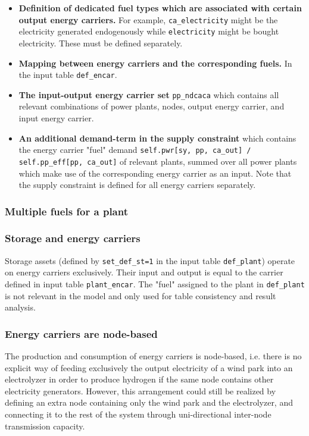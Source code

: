 \documentclass[]{article}
\begin{document}
\begin{itemize}
	\item \textbf{Definition of dedicated fuel types which are associated with certain output energy carriers.} For example, \verb|ca_electricity| might be the electricity generated endogenously while \verb|electricity| might be bought electricity. These must be defined separately.
	\item \textbf{Mapping between energy carriers and the corresponding fuels.} In the input table \verb|def_encar|.
	\item \textbf{The input-output energy carrier set} \verb|pp_ndcaca| which contains all relevant combinations of power plants, nodes, output energy carrier, and input energy carrier.
	\item \textbf{An additional demand-term in the supply constraint} which contains the energy carrier "fuel" demand \verb|self.pwr[sy, pp, ca_out] / self.pp_eff[pp, ca_out]|
	of relevant plants, summed over all power plants which make use of the corresponding energy carrier as an input. Note that the supply constraint is defined for all energy carriers separately.

	
\end{itemize}


\subsubsection{Multiple fuels for a plant}

\subsubsection{Storage and energy carriers}

Storage assets (defined by \verb|set_def_st=1| in the input table \verb|def_plant|) operate on energy carriers exclusively. Their input and output is equal to the carrier defined in input table \verb|plant_encar|. The "fuel" assigned to the plant in \verb|def_plant| is not relevant in the model and only used for table consistency and result analysis.

\subsubsection{Energy carriers are node-based}

The production and consumption of energy carriers is node-based, i.e. there is no explicit way of feeding exclusively the output electricity of a wind park into an electrolyzer in order to produce hydrogen if the same node contains other electricity generators. However, this arrangement could still be realized by defining an extra node containing only the wind park and the electrolyzer, and connecting it to the rest of the system through uni-directional inter-node transmission capacity.
\end{document}
